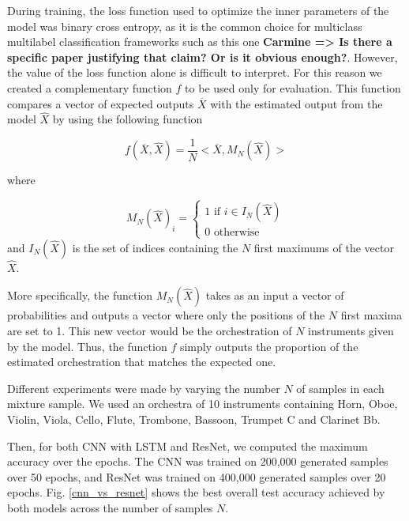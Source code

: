 \documentclass{article}
\newcommand{\carmine}[1]{\textbf{\color{red} Carmine => #1}}
\begin{document}
During training, the loss function used to optimize the inner parameters of the model was binary cross entropy, as it is the common choice for multiclass multilabel classification frameworks such as this one \carmine{Is there a specific paper justifying that claim? Or is it obvious enough?}. However, the value of the loss function alone is difficult to interpret. For this reason we created a complementary function $f$ to be used only for evaluation. This function compares a vector of expected outputs $\overline{X}$ with the estimated output from the model $\hat{X}$ by using the following function

\begin{equation}
f(\overline{X}, \hat{X}) = \frac{1}{N}<\overline{X}, M_N(\hat{X})>
\label{eval}
\end{equation}

where

\begin{equation}
M_N(\hat{X})_i = \left\{\begin{array}{ll}
1 \text{ if } i \in I_N(\hat{X})\\
0 \text{ otherwise}
\end{array}\right.
\label{NMax}
\end{equation}
and $I_N(\hat{X})$ is the set of indices containing the $N$ first maximums of the vector $\hat{X}$.

More specifically, the function $M_N(\hat{X})$ takes as an input a vector of probabilities and outputs a vector where only the positions of the $N$ first maxima are set to 1. This new vector would be the orchestration of $N$ instruments given by the model. Thus, the function $f$ simply outputs the proportion of the estimated orchestration that matches the expected one.

Different experiments were made by varying the number $N$ of samples in each mixture sample. We used an orchestra of 10 instruments containing Horn, Oboe, Violin, Viola, Cello, Flute, Trombone, Bassoon, Trumpet C and Clarinet Bb.

Then, for both CNN with LSTM and ResNet, we computed the maximum accuracy over the epochs. 
The CNN was trained on 200,000 generated samples over 50 epochs, and ResNet was trained on 400,000 generated samples over 20 epochs. Fig. \ref{cnn_vs_resnet} shows the best overall test accuracy achieved by both models across the number of samples $N$.\\
\end{document}
